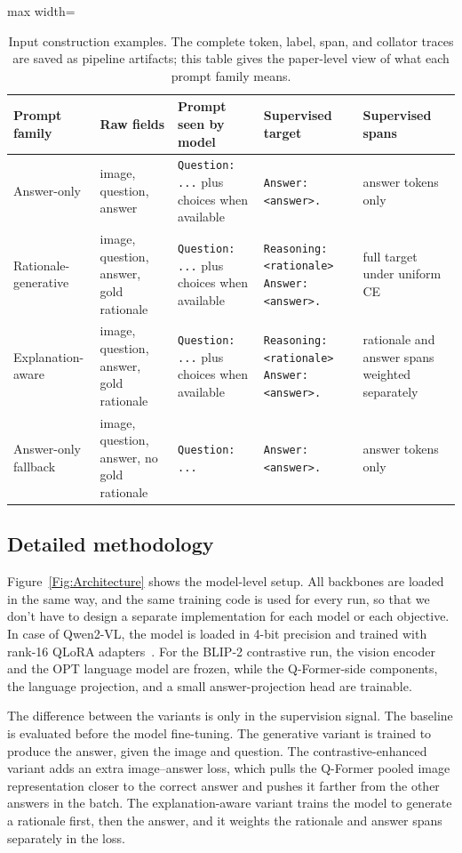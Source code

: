 \documentclass[preprint,12pt]{elsarticle}
\begin{document}
\begin{table}[!htbp]
\centering
\caption{Input construction examples. The complete token, label, span, and collator traces are saved as pipeline artifacts; this table gives the paper-level view of what each prompt family means.}
\label{tab:InputConstruction}
\scriptsize
\begin{adjustbox}{max width=\textwidth}
\begin{tabular}{|p{2.5cm}|p{3.6cm}|p{4.5cm}|p{4.5cm}|p{2.8cm}|}
\hline
\textbf{Prompt family} & \textbf{Raw fields} & \textbf{Prompt seen by model} & \textbf{Supervised target} & \textbf{Supervised spans} \\ \hline
Answer-only & image, question, answer & \texttt{Question: ...} plus choices when available & \texttt{Answer: <answer>.} & answer tokens only \\
Rationale-generative & image, question, answer, gold rationale & \texttt{Question: ...} plus choices when available & \texttt{Reasoning: <rationale> Answer: <answer>.} & full target under uniform CE \\
Explanation-aware & image, question, answer, gold rationale & \texttt{Question: ...} plus choices when available & \texttt{Reasoning: <rationale> Answer: <answer>.} & rationale and answer spans weighted separately \\
Answer-only fallback & image, question, answer, no gold rationale & \texttt{Question: ...} & \texttt{Answer: <answer>.} & answer tokens only \\ \hline
\end{tabular}
\end{adjustbox}
\end{table}

\subsection{Detailed methodology}
Figure~\ref{Fig:Architecture} shows the model-level setup.
All backbones are loaded in the same way, and the same training code is used for every run,
so that we don't have to design a separate implementation for each model or each objective.
In case of Qwen2-VL, the model is loaded in 4-bit precision and trained with rank-16 QLoRA adapters~\cite{hu2022lora,dettmers2023qlora}.
For the BLIP-2 contrastive run, the vision encoder and the OPT language model are frozen,
while the Q-Former-side components, the language projection, and a small answer-projection head are trainable.

The difference between the variants is only in the supervision signal.
The baseline is evaluated before the model fine-tuning.
The generative variant is trained to produce the answer, given the image and question.
The contrastive-enhanced variant adds an extra image--answer loss, which pulls the Q-Former pooled image representation
closer to the correct answer and pushes it farther from the other answers in the batch.
The explanation-aware variant trains the model to generate a rationale first, then the answer, and it weights the rationale and answer spans separately in the loss.
\end{document}
